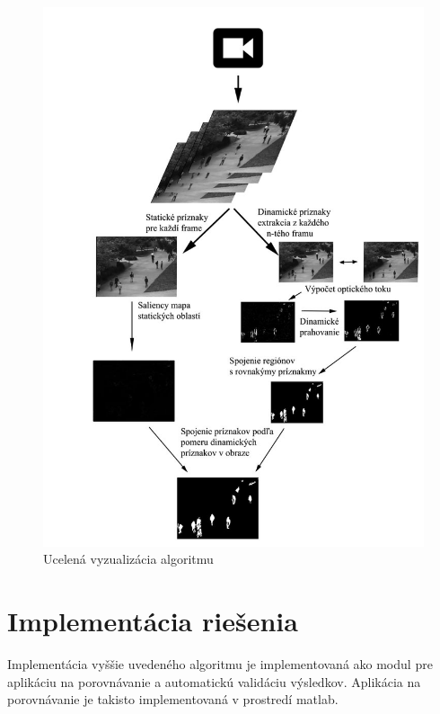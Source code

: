   \begin{figure}[H]
    \centering
    \includegraphics[width=15cm]{pics/workflow.jpg}
    \caption{Ucelená vyzualizácia algoritmu}
    \vspace{10mm}
  \end{figure}

\section{Implementácia riešenia}
Implementácia vyššie uvedeného algoritmu je implementovaná ako modul pre aplikáciu na porovnávanie a  automatickú validáciu výsledkov.
Aplikácia na porovnávanie je takisto implementovaná v prostredí matlab.

